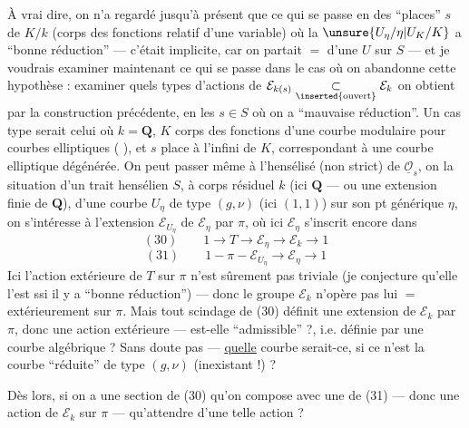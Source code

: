 À vrai dire, on n'a regardé jusqu'à présent que ce qui se passe en des ``places'' $s$ de $K/k$ (corps des fonctions relatif d'une variable) où la   $\unsure{U_\eta/\eta|U_K/K}$ a ``bonne réduction'' --- c'était implicite, car on partait $=$ d'une $U$ sur $S$ --- et je voudrais examiner maintenant ce qui se passe dans le cas où on abandonne cette hypothèse : examiner quels types d'actions de $\mathcal E_{k(s)}\underset{\inserted{\text{ouvert}}}{\subset}\mathcal E_k$ on obtient par la construction précédente, en les $s\in S$ où on a ``mauvaise réduction''. Un cas type serait celui où $k=\mathbf Q$, $K$ corps des fonctions d'une courbe modulaire pour courbes elliptiques ( ), et $s$ place à l'infini de $K$, correspondant à une courbe elliptique
dégénérée. On peut passer même à l'hensélisé (non strict) de $\underline{\mathcal O}_s$, on  la situation d'un trait hensélien $S$, à corps résiduel $k$ (ici $\mathbf Q$ --- ou une extension finie de $\mathbf Q$), d'une courbe $U_\eta$ de type $(g,\nu)$ (ici $(1,1)$) sur son pt générique $\eta$, on s'intéresse à l'extension $\mathcal E_{U_\eta}$ de $\mathcal E_\eta$ par $\pi$, où ici $\mathcal E_\eta$ s'inscrit encore dans
\[
(30)\qquad 1\longrightarrow T\longrightarrow\mathcal E_\eta\longrightarrow\mathcal E_k\longrightarrow1
\]
 
\[
(31)\qquad 1-\pi-\mathcal E_{U_\eta}\longrightarrow\mathcal E_\eta\longrightarrow1
\]
Ici l'action extérieure de $T$ sur $\pi$ n'est sûrement pas triviale (je conjecture qu'elle l'est ssi il y a ``bonne réduction'') --- donc le groupe $\mathcal E_k$ n'opère pas lui $=$ extérieurement sur $\pi$. Mais tout scindage de (30)
définit une extension de $\mathcal E_k$ par $\pi$, donc une action extérieure --- est-elle ``admissible'' ?, i.e. définie par une courbe algébrique ? Sans doute pas --- \uline{quelle} courbe serait-ce, si ce n'est la courbe ``réduite'' de type $(g,\nu)$ (inexistant !) ?

Dès lors, si on a une section de (30) qu'on compose avec une de (31) --- donc une action  de $\mathcal E_k$ sur $\pi$ --- qu'attendre d'une telle action ?


